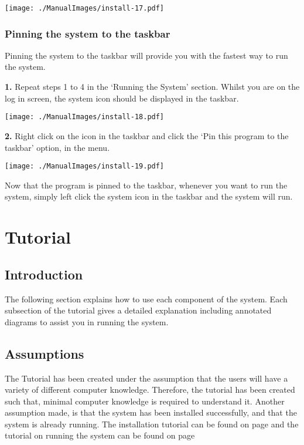 \texttt{[image: ./ManualImages/install-17.pdf]}

\subsubsection{Pinning the system to the taskbar}

Pinning the system to the taskbar will provide you with the fastest way to run the system.

\textbf{1.} Repeat steps 1 to 4 in the `Running the System' section. Whilst you are on the log in screen, the system icon should be displayed in the taskbar.

\texttt{[image: ./ManualImages/install-18.pdf]}

\textbf{2.} Right click on the icon in the taskbar and click the `Pin this program to the taskbar' option, in the menu.

\texttt{[image: ./ManualImages/install-19.pdf]}

Now that the program is pinned to the taskbar, whenever you want to run the system, simply left click the system icon in the taskbar and the system will run.

\pagebreak

\section{Tutorial}

\subsection{Introduction}
The following section explains how to use each component of the system. Each subsection of the tutorial gives a detailed explanation including annotated diagrams to assist you in running the system.


\subsection{Assumptions}

The Tutorial has been created under the assumption that the users will have a variety of different computer knowledge. Therefore, the tutorial has been created such that, minimal computer knowledge is required to understand it. Another assumption made, is that the system has been installed successfully, and that the system is already running. The installation tutorial can be found on page \pageref{fig:System Installation} and the tutorial on running the system can be found on page \pageref{fig:Running the System}

